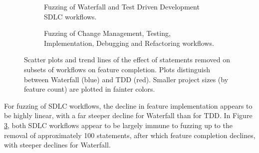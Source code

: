 \documentclass{llncs}
\begin{document}
\begin{figure}[t]
  \centering
  \begin{subfigure}[t]{2.3in}%
    \caption{Fuzzing of Waterfall and Test Driven Development SDLC workflows.}
    \label{fig:fuzzing-features:WT}
  \end{subfigure}
  \begin{subfigure}[t]{2.3in}
    \caption{Fuzzing of Change Management, Testing, Implementation, Debugging and Refactoring workflows.}  
  \label{fig:fuzzing-features:CTIDR}
  \end{subfigure}
  
  \caption{Scatter plots and trend lines of the effect of statements removed on subsets of workflows on feature
    completion. Plots distinguish between Waterfall (blue) and TDD (red).  Smaller project sizes (by feature count) are
    plotted in fainter colors.}
  \label{fig:fuzzing-features}
\end{figure}


For fuzzing of SDLC workflows, the decline in feature implementation appears to be highly linear, with a far steeper
decline for Waterfall than for TDD.  In Figure \ref{fig:fuzzing-features}, both SDLC workflows appear to be largely
immune to fuzzing up to the removal of approximately 100 statements, after which feature completion declines, with
steeper declines for Waterfall.
\end{document}
